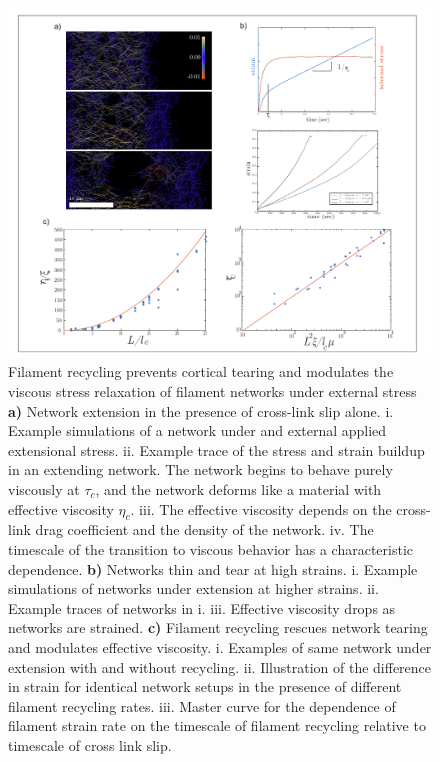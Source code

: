 \documentclass[10pt,letterpaper]{article}
\begin{document}
\begin{figure}[h!]
\centering
\includegraphics[width=\hsize]{figures/fig3/fig3}
\caption{\label{fig:passive} Filament recycling prevents cortical tearing and modulates the viscous stress relaxation of filament networks under external stress \textbf{a)} Network extension in the presence of cross-link slip alone. i. Example simulations of a network under and external applied extensional stress. ii. Example trace of the stress and strain buildup in an extending network.  The network begins to behave purely viscously at $\tau_c$, and the network deforms like a material with effective viscosity $\eta_c$. iii. The effective viscosity depends on the cross-link drag coefficient and the density of the network. iv. The timescale of the transition to viscous behavior has a characteristic dependence. \textbf{b)} Networks thin and tear at high strains. i. Example simulations of networks under extension at higher strains. ii. Example traces of networks in i.  iii.  Effective viscosity drops as networks are strained. \textbf{c)} Filament recycling rescues network tearing and modulates effective viscosity. i. Examples of same network under extension with and without recycling. ii.  Illustration of the difference in strain for identical network setups in the presence of different filament recycling rates. iii. Master curve for the dependence of filament strain rate on the timescale of filament recycling relative to timescale of cross link slip. }
\end{figure}
\end{document}
